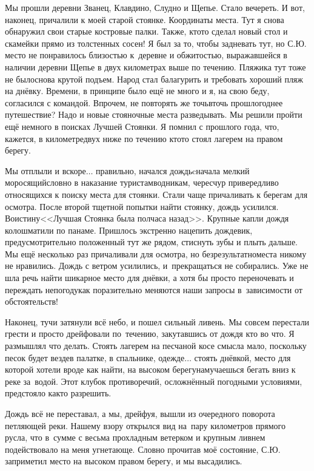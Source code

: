 Мы прошли деревни Званец, Клавдино, Слудно и Щепье. Стало вечереть. И вот, наконец, причалили к моей старой стоянке. Координаты места\mdash \CoordsChagodoschaFifteenSecondDnevka. Тут я снова обнаружил свои старые костровые палки. Также, кто\sdash то сделал новый стол и скамейки прямо из толстенных сосен! Я был за то, чтобы задневать тут, но С.Ю. место не понравилось близостью к~деревне и обжитостью, выражавшейся в наличии деревни Щепье в двух километрах выше по течению. Пляжика тут тоже не было\mdash снова крутой подъем. Народ стал балагурить и требовать хороший пляж на днёвку. Времени, в принципе было ещё не много и я, на свою беду, согласился с командой. Впрочем, не повторять же точь\sdash в\sdash точь прошлогоднее путешествие? Надо и новые стояночные места разведывать. Мы решили пройти ещё немного в поисках Лучшей Стоянки. Я помнил с прошлого года, что, кажется, в километре\sdash двух ниже по течению кто\sdash то стоял лагерем на правом берегу.

\newpage
Мы отплыли и вскоре$\ldots$ правильно, начался дождь\mdash cначала мелкий моросящий\mdash словно в наказание туристам\sdash водникам, чересчур привередливо относящихся к поиску места для стоянки. Стали чаще причаливать к берегам для осмотра. После второй тщетной попытки найти стоянку, дождь усилился. Воистину\mdash <<Лучшая Стоянка была полчаса назад>>. Крупные капли дождя колошматили по панаме. Пришлось экстренно нацепить дождевик, предусмотрительно положенный тут же рядом, стиснуть зубы и плыть дальше. Мы ещё несколько раз причаливали для осмотра, но безрезультатно\mdash места никому не нравились. Дождь с ветром усилились, и~прекращаться не собирались. Уже не шла речь найти шикарное место для днёвки, а хотя бы просто переночевать и переждать непогоду\mdash как поразительно меняются наши запросы в~зависимости от обстоятельств!

Наконец, тучи затянули всё небо, и пошел сильный ливень. Мы совсем перестали грести и просто дрейфовали по~течению, закутавшись от дождя кто во что. Я размышлял что делать. Стоять лагерем на песчаной косе смысла мало, поскольку песок будет везде\mdash в палатке, в спальнике, одежде$\ldots$ стоять днёвкой, место для которой хотели вроде как найти, на высоком берегу\mdash намучаешься бегать вниз к реке за~водой. Этот клубок противоречий, осложнённый погодными условиями, предстояло как\sdash то разрешить. 

Дождь всё не переставал, а мы, дрейфуя, вышли из очередного поворота петляющей реки. Нашему взору открылся вид на~пару километров прямого русла, что в~сумме с весьма прохладным ветерком и крупным ливнем подействовало на меня угнетающе. Словно прочитав моё состояние, С.Ю. заприметил место на высоком правом берегу, и мы высадились. 

